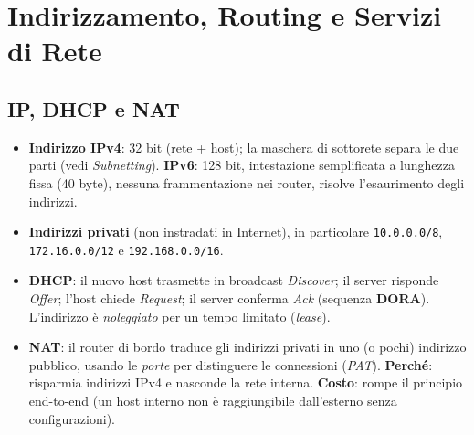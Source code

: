 \section{Indirizzamento, Routing e Servizi di Rete}

\subsection{IP, DHCP e NAT}
\begin{itemize}
    \item \textbf{Indirizzo IPv4}: 32 bit (rete + host); la maschera di sottorete separa le due parti (vedi \emph{Subnetting}). \textbf{IPv6}: 128 bit, intestazione semplificata a lunghezza fissa (40 byte), nessuna frammentazione nei router, risolve l'esaurimento degli indirizzi.
    \item \textbf{Indirizzi privati} (non instradati in Internet), in particolare \texttt{10.0.0.0/8}, \texttt{172.16.0.0/12} e \texttt{192.168.0.0/16}.
    \item \textbf{DHCP}: il nuovo host trasmette in broadcast \emph{Discover}; il server risponde \emph{Offer}; l'host chiede \emph{Request}; il server conferma \emph{Ack} (sequenza \textbf{DORA}). L'indirizzo è \emph{noleggiato} per un tempo limitato (\emph{lease}).
    \item \textbf{NAT}: il router di bordo traduce gli indirizzi privati in uno (o pochi) indirizzo pubblico, usando le \emph{porte} per distinguere le connessioni (\emph{PAT}). \textbf{Perché}: risparmia indirizzi IPv4 e nasconde la rete interna. \textbf{Costo}: rompe il principio end-to-end (un host interno non è raggiungibile dall'esterno senza configurazioni).
\end{itemize}

